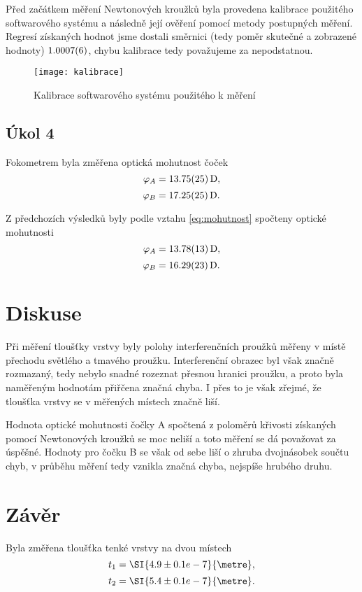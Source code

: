 \documentclass{protokol}
\begin{document}
      Před začátkem měření Newtonových kroužků byla provedena kalibrace použitého softwarového systému a následně její ověření pomocí metody postupných měření. Regresí získaných hodnot jsme dostali směrnici (tedy poměr skutečné a zobrazené hodnoty) $\SI{1.0007 \pm 0.0006}{}$, chybu kalibrace tedy považujeme za nepodstatnou. 

      \begin{figure}[H]
        \centering
        \texttt{[image: kalibrace]}
        \caption{Kalibrace softwarového systému použitého k měření}
        \label{fig:u4s}
      \end{figure}

    \subsection*{Úkol 4}

      Fokometrem byla změřena optická mohutnost čoček 
      $$ \varphi_A = \SI{13.75 \pm 0.25}{D}, $$
      $$ \varphi_B = \SI{17.25 \pm 0.25}{D}. $$

      Z předchozích výsledků byly podle vztahu \eqref{eq:mohutnost} spočteny optické mohutnosti
      $$ \varphi_A = \SI{13.78 \pm 0.13}{D}, $$
      $$ \varphi_B = \SI{16.29 \pm 0.23}{D}. $$

  \section*{Diskuse}

    Při měření tloušťky vrstvy byly polohy interferenčních proužků měřeny v místě přechodu světlého a tmavého proužku. Interferenční obrazec byl však značně rozmazaný, tedy nebylo snadné rozeznat přesnou hranici proužku, a proto byla naměřeným hodnotám přiřčena značná chyba. I přes to je však zřejmé, že tloušťka vrstvy se v měřených místech značně liší.

    Hodnota optické mohutnosti čočky A spočtená z poloměrů křivosti získaných pomocí Newtonových kroužků se moc neliší a toto měření se dá považovat za úspěšné. Hodnoty pro čočku B se však od sebe liší o zhruba dvojnásobek součtu chyb, v průběhu měření tedy vznikla značná chyba, nejspíše hrubého druhu.

  \section*{Závěr}

    Byla změřena tloušťka tenké vrstvy na dvou místech 
    $$ t_1 = \SI{4.9 \pm 0.1 e-7}{\metre}, $$
    $$ t_2 = \SI{5.4 \pm 0.1 e-7}{\metre}. $$
\end{document}
